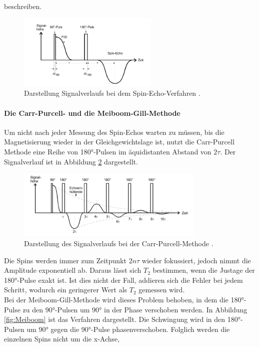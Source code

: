 beschreiben.
\begin{figure}[H]
  \centering
  \includegraphics[width=0.6\textwidth]{pics/Signalverlauf.png}
  \caption{Darstellung Signalverlaufs bei dem Spin-Echo-Verfahren \cite{Anleitung}.}
  \label{fig:Signal}
\end{figure}
\paragraph{Die Carr-Purcell- und die Meiboom-Gill-Methode}
Um nicht nach jeder Messung des Spin-Echos warten zu müssen, bis die Magnetisierung wieder
in der Gleichgewichtslage ist, nutzt die Carr-Purcell Methode eine Reihe von
180°-Pulsen im äquidistanten Abstand von $2\tau$. Der Signalverlauf ist in Abbildung
\ref{fig:CPM} dargestellt.
\begin{figure}[H]
  \centering
  \includegraphics[width=0.8\textwidth]{pics/CPM.png}
  \caption{Darstellung des Signalverlaufs bei der Carr-Purcell-Methode \cite{Anleitung}.}
  \label{fig:CPM}
\end{figure}
Die Spins werden immer zum Zeitpunkt $2n\tau$ wieder fokussiert,
jedoch nimmt die Amplitude exponentiell ab. Daraus lässt sich $T_2$ bestimmen, wenn
die Justage der 180°-Pulse exakt ist. Ist dies nicht der Fall, addieren sich die
Fehler bei jedem Schritt, wodurch ein geringerer Wert als $T_2$ gemessen wird.\\
Bei der Meiboom-Gill-Methode wird dieses Problem behoben, in dem die 180°-Pulse
zu den 90°-Pulsen um 90° in der Phase verschoben werden. In Abbildung \ref{fig:Meiboom}
ist das Verfahren dargestellt. Die Schwingung wird in den 180°-Pulsen
um 90° gegen die 90°-Pulse phasenverschoben.
Folglich werden die einzelnen Spins nicht um die x-Achse,
